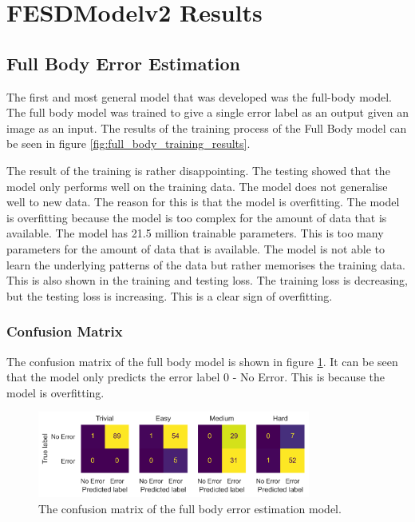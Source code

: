 \section{FESDModelv2 Results}

\subsection{Full Body Error Estimation}

The first and most general model that was developed was the full-body model. The full body model was trained to give a single error label as an output given an image as an input. The results of the training process of the Full Body model can be seen in figure \ref{fig:full_body_training_results}.

The result of the training is rather disappointing. The testing showed that the model only performs well on the training data. The model does not generalise well to new data. The reason for this is that the model is overfitting. The model is overfitting because the model is too complex for the amount of data that is available. The model has 21.5 million trainable parameters. This is too many parameters for the amount of data that is available. The model is not able to learn the underlying patterns of the data but rather memorises the training data. This is also shown in the training and testing loss. The training loss is decreasing, but the testing loss is increasing. This is a clear sign of overfitting.

\subsubsection{Confusion Matrix}

The confusion matrix of the full body model is shown in figure \ref{fig:full_body_confusion_matrix}. It can be seen that the model only predicts the error label $0$ - No Error. This is because the model is overfitting.

\begin{figure}[ht]
  \centering
  \includegraphics[width=0.8\textwidth]{figures/results/confusion/full.png}
  \caption[Full Body model confusion matrix]{The confusion matrix of the full body error estimation model.}
  \label{fig:full_body_confusion_matrix}
\end{figure}

